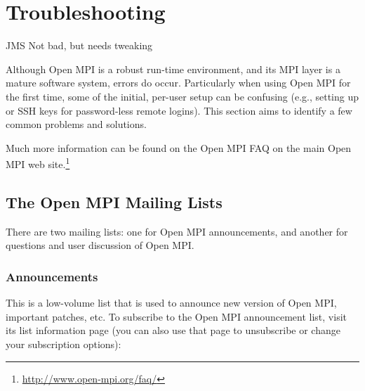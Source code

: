 %
% 
% 
%

\chapter{Troubleshooting}
\label{sec:troubleshooting}

{\Huge JMS Not bad, but needs tweaking}

Although Open MPI is a robust run-time environment, and its MPI layer
is a mature software system, errors do occur.  Particularly when using
Open MPI for the first time, some of the initial, per-user setup can
be confusing (e.g., setting up  or SSH keys for
password-less remote logins).  This section aims to identify a few
common problems and solutions.

Much more information can be found on the Open MPI FAQ on the main
Open MPI web site.\footnote{\url{http://www.open-mpi.org/faq/}}


\section{The Open MPI Mailing Lists}
\label{troubleshooting:mailing-lists}

There are two mailing lists: one for Open MPI announcements, and
another for questions and user discussion of Open MPI.


\subsection{Announcements}
  
This is a low-volume list that is used to announce new version of
Open MPI, important patches, etc.  To subscribe to the Open MPI announcement
list, visit its list information page (you can also use that page to
unsubscribe or change your subscription options):

